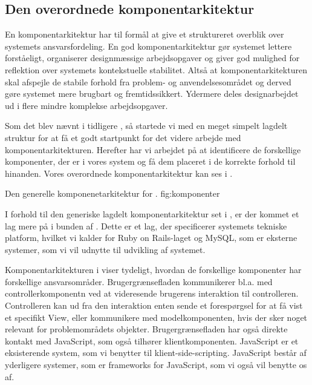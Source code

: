\subsection{Den overordnede komponentarkitektur}
\label{sec:overordnetkomponent}
En komponentarkitektur har til formål at give et struktureret overblik over systemets ansvarsfordeling. En god komponentarkitektur gør systemet lettere forståeligt, organiserer designmæssige arbejdsopgaver og giver god mulighed for reflektion over systemets kontekstuelle stabilitet. Altså at komponentarkitekturen skal afspejle de stabile forhold fra problem- og anvendelsesområdet og derved gøre systemet mere brugbart og fremtidssikkert. Ydermere deles designarbejdet ud i flere mindre komplekse arbejdsopgaver. 

Som det blev nævnt i tidligere , så startede vi med en meget simpelt lagdelt struktur for at få et godt startpunkt for det videre arbejde med komponentarkitekturen. Herefter har vi arbejdet på at identificere de forskellige komponenter, der er i vores system og få dem placeret i de korrekte forhold til hinanden. Vores overordnede komponentarkitektur kan ses i .

	{Den generelle komponenetarkitektur for \Foodl{}.}
	{fig:komponenter}

I forhold til den generiske lagdelt komponentarkitektur set i , er der kommet et lag mere på i bunden af . Dette er et lag, der specificerer systemets tekniske platform, hvilket vi kalder for Ruby on Rails-laget og MySQL, som er eksterne systemer, som vi vil udnytte til udvikling af systemet.

Komponentarkitekturen i  viser tydeligt, hvordan de forskellige komponenter har forskellige ansvarsområder. 
Brugergrænsefladen kommunikerer bl.a. med controllerkomponentn ved at videresende brugerens interaktion til controlleren. Controlleren kan ud fra den interaktion enten sende et forespørgsel for at få vist et specifikt View, eller kommunikere med modelkomponenten, hvis der sker noget relevant for problemområdets objekter. Brugergrænsefladen har også direkte kontakt med JavaScript, som også tilhører klientkomponenten.  JavaScript er et eksisterende system, som vi benytter til klient-side-scripting. JavaScript består af yderligere systemer, som er frameworks for JavaScript, som vi også vil benytte os af.

